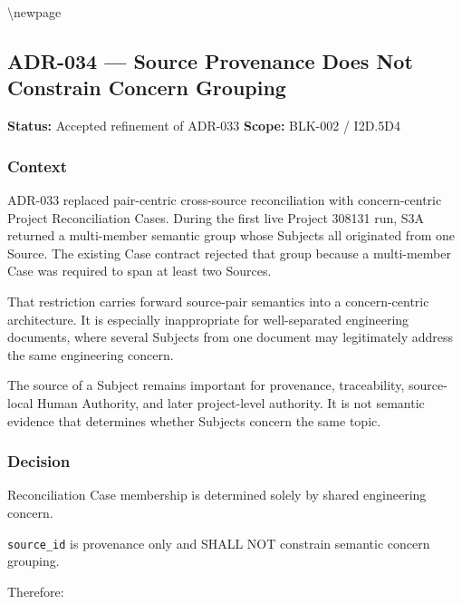 \textbackslash newpage

\hypertarget{adr-034--source-provenance-does-not-constrain-concern-grouping}{%
\subsection{ADR-034 --- Source Provenance Does Not Constrain Concern Grouping}\label{adr-034--source-provenance-does-not-constrain-concern-grouping}}

\textbf{Status:} Accepted refinement of ADR-033 \textbf{Scope:} BLK-002 / I2D.5D4

\hypertarget{context-20}{%
\subsubsection{Context}\label{context-20}}

ADR-033 replaced pair-centric cross-source reconciliation with concern-centric Project Reconciliation Cases. During the first live Project 308131 run, S3A returned a multi-member semantic group whose Subjects all originated from one Source. The existing Case contract rejected that group because a multi-member Case was required to span at least two Sources.

That restriction carries forward source-pair semantics into a concern-centric architecture. It is especially inappropriate for well-separated engineering documents, where several Subjects from one document may legitimately address the same engineering concern.

The source of a Subject remains important for provenance, traceability, source- local Human Authority, and later project-level authority. It is not semantic evidence that determines whether Subjects concern the same topic.

\hypertarget{decision-20}{%
\subsubsection{Decision}\label{decision-20}}

Reconciliation Case membership is determined solely by shared engineering concern.

\texttt{source\_id} is provenance only and SHALL NOT constrain semantic concern grouping.

Therefore:

